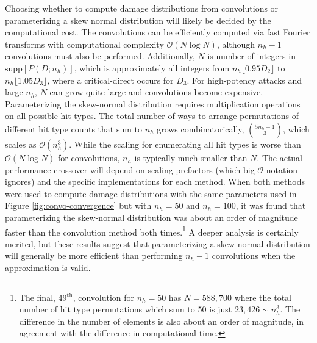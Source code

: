 \documentclass{article}
\begin{document}
    Choosing whether to compute damage distributions from convolutions or parameterizing a skew normal distribution will likely be decided by the computational cost. The convolutions can be efficiently computed via fast Fourier transforms with computational complexity $\mathcal{O}(N \log N)$, although $n_h-1$ convolutions must also be performed. Additionally, $N$ is number of integers in $\textrm{supp}[P(D;n_h)]$, which is approximately all integers from $n_h \lfloor 0.95 D_2 \rfloor$ to $n_h \lfloor 1.05 D_3 \rfloor$, where a critical-direct occurs for $D_3$. For high-potency attacks and large $n_h$, $N$ can grow quite large and convolutions become expensive. Parameterizing the skew-normal distribution requires multiplication operations on all possible hit types. The total number of ways to arrange permutations of different hit type counts that sum to $n_h$  grows combinatorically, $\binom{5n_h-1}{3}$, which scales as $\mathcal{O}(n_h^3)$. While the scaling for enumerating all hit types is worse than $\mathcal{O}(N \log N)$ for convolutions, $n_h$ is typically much smaller than $N$. The actual performance crossover will depend on scaling prefactors (which big $\mathcal{O}$ notation ignores) and the specific implementations for each method. When both methods were used to compute damage distributions with the same parameters used in Figure \ref{fig:convo-convergence} but with $n_h = 50$ and $n_h = 100$, it was found that parameterizing the skew-normal distribution was about an order of magnitude faster than the convolution method both times.\footnote{The final, 49$^\textrm{th}$, convolution for $n_h = 50$ has $N = 588,700$ where the total number of hit type permutations which sum to 50 is just $23,426 \sim n_h^3$. The difference in the number of elements is also about an order of magnitude, in agreement with the difference in computational time.}  A deeper analysis is certainly merited, but these results suggest that parameterizing a skew-normal distribution will generally be more efficient than performing $n_h-1$ convolutions when the approximation is valid.
    
\end{document}
